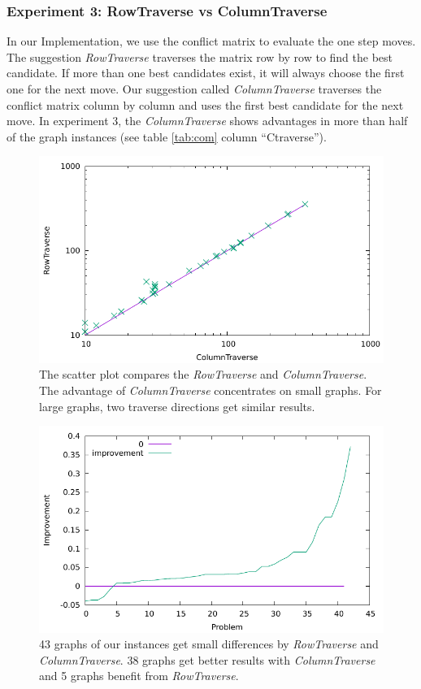 \documentclass[12pt,a4paper,twoside]{scrartcl}
\numberwithin{equation}{section}
\begin{document}
\subsubsection{Experiment 3: RowTraverse vs ColumnTraverse}
\label{sec:Experiment 3}
In our Implementation, we use the conflict matrix to evaluate the one step moves. The suggestion \emph{RowTraverse} traverses the matrix row by row to find the best candidate. If more than one best candidates exist, it will always choose the first one for the next move. Our suggestion called \emph{ColumnTraverse} traverses the conflict matrix column by column and uses the first best candidate for the next move. In experiment 3, the \emph{ColumnTraverse} shows advantages in more than half of the graph instances (see table \ref{tab:com} column ``Ctraverse'').
\begin{figure}[h!]
\centering
  \includegraphics[scale = 1]{Experiments/E3/scalog.pdf}
      \caption{The scatter plot compares the \emph{RowTraverse} and \emph{ColumnTraverse}. The advantage of \emph{ColumnTraverse} concentrates on small graphs. For large graphs, two traverse directions get similar results.}
\end{figure}

\begin{figure}[h!]
\centering
  \includegraphics[scale = 1]{Experiments/E3/impro.pdf}
      \caption{ 43 graphs of our instances get small differences by \emph{RowTraverse}  and \emph{ColumnTraverse}. 38 graphs get better results with  \emph{ColumnTraverse} and 5 graphs benefit from \emph{RowTraverse}.}
\end{figure}
\end{document}

